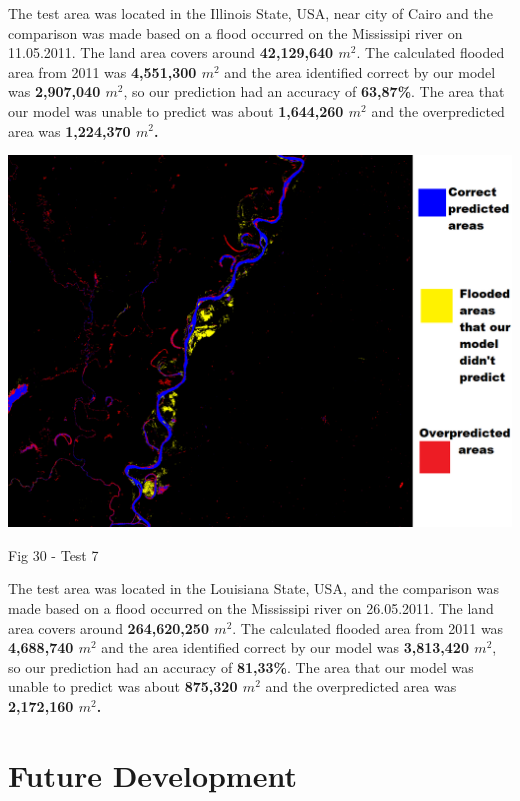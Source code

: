 \documentclass[12pt, a4paper]{report}
\begin{document}
The test area was located in the Illinois State, USA, near city of Cairo and the comparison was made based on a flood occurred on the Mississipi river on 11.05.2011. The land area covers around \textbf{42,129,640 $m^2$}. The calculated flooded area from 2011 was \textbf{4,551,300 $m^2$} and the area identified correct by our model was \textbf{2,907,040 $m^2$}, so our prediction had an accuracy of \textbf{63,87\%}. The area that our model was unable to predict was about \textbf{1,644,260 $m^2$} and the overpredicted area was \textbf{1,224,370 $m^2$.}

\newpage

\bigskip
\includegraphics[scale=0.5, center]{test_7.png}
\begin{center}
Fig 30 - Test 7
\end{center}
\par 

The test area was located in the Louisiana State, USA, and the comparison was made based on a flood occurred on the Mississipi river on 26.05.2011. The land area covers around \textbf{264,620,250 $m^2$}. The calculated flooded area from 2011 was \textbf{4,688,740 $m^2$} and the area identified correct by our model was \textbf{3,813,420 $m^2$}, so our prediction had an accuracy of \textbf{81,33\%}. The area that our model was unable to predict was about \textbf{875,320 $m^2$} and the overpredicted area was \textbf{2,172,160 $m^2$.}

\newpage

\section{Future Development}
\end{document}
